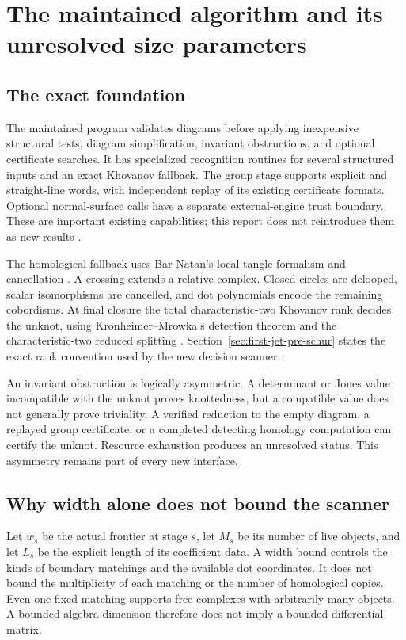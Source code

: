 \section{The maintained algorithm and its unresolved size parameters}
\label{sec:baseline}

\subsection{The exact foundation}

The maintained program validates diagrams before applying inexpensive
structural tests, diagram simplification, invariant obstructions, and
optional certificate searches. It has specialized recognition routines for
several structured inputs and an exact Khovanov fallback. The group stage
supports explicit and straight-line words, with independent replay of
its existing certificate formats. Optional normal-surface calls have a
separate external-engine trust boundary. These are important existing
capabilities; this report does not reintroduce them as new results
\cite{ProveItBaseline}.

The homological fallback uses Bar-Natan's local tangle formalism and
cancellation \cite{BarNatan2005,BarNatan2007}. A crossing extends a relative
complex. Closed circles are delooped, scalar isomorphisms are cancelled,
and dot polynomials encode the remaining cobordisms. At final closure the
total characteristic-two Khovanov rank decides the unknot, using
Kronheimer--Mrowka's detection theorem and the characteristic-two reduced
splitting \cite{KM2011Kh,Shumakovitch2014}. Section~\ref{sec:first-jet-pre-schur}
states the exact rank convention used by the new decision scanner.

An invariant obstruction is logically asymmetric. A determinant or Jones
value incompatible with the unknot proves knottedness, but a compatible
value does not generally prove triviality. A verified reduction to the
empty diagram, a replayed group certificate, or a completed detecting
homology computation can certify the unknot. Resource exhaustion produces
an unresolved status. This asymmetry remains part of every new interface.

\subsection{Why width alone does not bound the scanner}

Let $w_s$ be the actual frontier at stage $s$, let $M_s$ be its number of
live objects, and let $L_s$ be the explicit length of its coefficient data.
A width bound controls the kinds of boundary matchings and the available
dot coordinates. It does not bound the multiplicity of each matching or
the number of homological copies. Even one fixed matching supports free
complexes with arbitrarily many objects. A bounded algebra dimension
therefore does not imply a bounded differential matrix.

